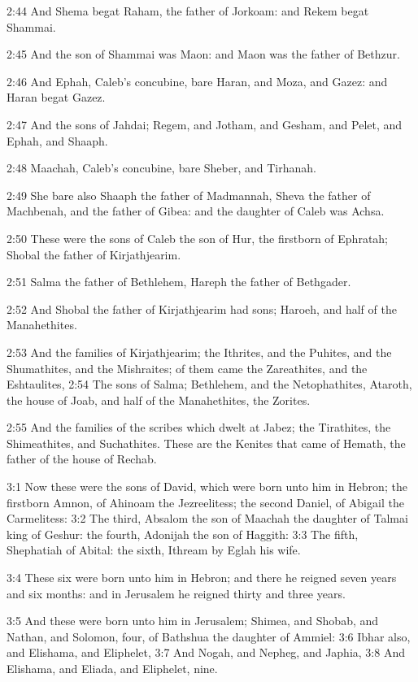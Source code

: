2:44 And Shema begat Raham, the father of Jorkoam: and Rekem begat Shammai.

2:45 And the son of Shammai was Maon: and Maon was the father of Bethzur.

2:46 And Ephah, Caleb's concubine, bare Haran, and Moza, and Gazez: and Haran begat Gazez.

2:47 And the sons of Jahdai; Regem, and Jotham, and Gesham, and Pelet, and Ephah, and Shaaph.

2:48 Maachah, Caleb's concubine, bare Sheber, and Tirhanah.

2:49 She bare also Shaaph the father of Madmannah, Sheva the father of Machbenah, and the father of Gibea: and the daughter of Caleb was Achsa.

2:50 These were the sons of Caleb the son of Hur, the firstborn of Ephratah; Shobal the father of Kirjathjearim.

2:51 Salma the father of Bethlehem, Hareph the father of Bethgader.

2:52 And Shobal the father of Kirjathjearim had sons; Haroeh, and half of the Manahethites.

2:53 And the families of Kirjathjearim; the Ithrites, and the Puhites, and the Shumathites, and the Mishraites; of them came the Zareathites, and the Eshtaulites, 2:54 The sons of Salma; Bethlehem, and the Netophathites, Ataroth, the house of Joab, and half of the Manahethites, the Zorites.

2:55 And the families of the scribes which dwelt at Jabez; the Tirathites, the Shimeathites, and Suchathites. These are the Kenites that came of Hemath, the father of the house of Rechab.

3:1 Now these were the sons of David, which were born unto him in Hebron; the firstborn Amnon, of Ahinoam the Jezreelitess; the second Daniel, of Abigail the Carmelitess: 3:2 The third, Absalom the son of Maachah the daughter of Talmai king of Geshur: the fourth, Adonijah the son of Haggith: 3:3 The fifth, Shephatiah of Abital: the sixth, Ithream by Eglah his wife.

3:4 These six were born unto him in Hebron; and there he reigned seven years and six months: and in Jerusalem he reigned thirty and three years.

3:5 And these were born unto him in Jerusalem; Shimea, and Shobab, and Nathan, and Solomon, four, of Bathshua the daughter of Ammiel: 3:6 Ibhar also, and Elishama, and Eliphelet, 3:7 And Nogah, and Nepheg, and Japhia, 3:8 And Elishama, and Eliada, and Eliphelet, nine.

